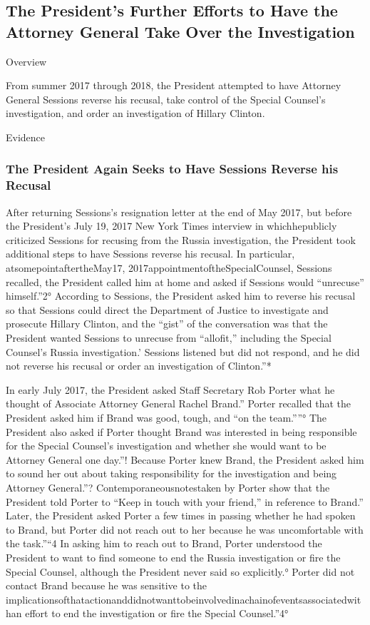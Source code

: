 \subsection{The President's Further Efforts to Have the Attorney General Take Over the Investigation}

Overview

From summer 2017 through 2018, the President attempted to have Attorney General Sessions reverse his recusal, take control of the Special Counsel's investigation, and order an investigation of Hillary Clinton.

Evidence

\subsubsection{The President Again Seeks to Have Sessions Reverse his Recusal}

After returning Sessions's resignation letter at the end of May 2017, but before the President's July 19, 2017 New York Times interview in whichhepublicly criticized Sessions for recusing from the Russia investigation, the President took additional steps to have Sessions reverse his recusal.
In particular, atsomepointaftertheMay17, 2017appointmentoftheSpecialCounsel, Sessions recalled, the President called him at home and asked if Sessions would “unrecuse” himself.”2°
According to Sessions, the President asked him to reverse his recusal so that Sessions could direct the Department of Justice to investigate and prosecute Hillary Clinton, and the “gist” of the conversation was that the President wanted Sessions to unrecuse from “allofit,” including the Special Counsel's Russia investigation.'
Sessions listened but did not respond, and he did not reverse his recusal or order an investigation of Clinton.”*

In early July 2017, the President asked Staff Secretary Rob Porter what he thought of Associate Attorney General Rachel Brand.”
Porter recalled that the President asked him if Brand was good, tough, and “on the team.””°
The President also asked if Porter thought Brand was interested in being responsible for the Special Counsel's investigation and whether she would want to be Attorney General one day.”!
Because Porter knew Brand, the President asked him to sound her out about taking responsibility for the investigation and being Attorney General.”?
Contemporaneousnotestaken by Porter show that the President told Porter to “Keep in touch with your friend,” in reference to Brand.”
Later, the President asked Porter a few times in passing whether he had spoken to Brand, but Porter did not reach out to her because he was uncomfortable with the task.”“4
In asking him to reach out to Brand, Porter understood the President to want to find someone to end the Russia investigation or fire the Special Counsel, although the President never said so explicitly.°
Porter did not contact Brand because he was sensitive to the implicationsofthatactionanddidnotwanttobeinvolvedinachainofeventsassociatedwithan effort to end the investigation or fire the Special Counsel.”4°

